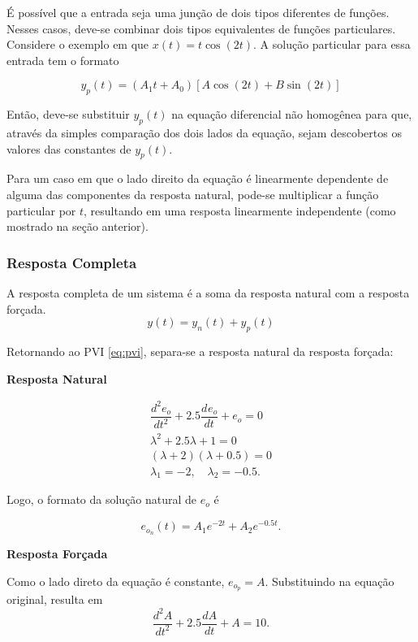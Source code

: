 \documentclass{article}
\numberwithin{equation}{section}
\newcommand{\deo}[1]{\dfrac{d^{#1}e_o}{dt^{#1}}}
\begin{document}
É possível que a entrada seja uma junção de dois tipos diferentes de funções. Nesses casos, deve-se combinar dois tipos equivalentes de funções particulares. Considere o exemplo em que $x(t) = t \cos(2t)$. A solução particular para essa entrada tem o formato

\begin{equation*}
    y_{p}(t)=(A_{1}t+A_{0})[A\cos(2t)+B\sin(2t)]
\end{equation*}

Então, deve-se substituir $y_{p}(t)$ na equação diferencial não homogênea para que, através da simples comparação dos dois lados da equação, sejam descobertos os valores das constantes de $y_{p}(t)$.

Para um caso em que o lado direito da equação é linearmente dependente de alguma das componentes da resposta natural, pode-se multiplicar a função particular por $t$, resultando em uma resposta linearmente independente (como mostrado na seção anterior).

\subsubsection{Resposta Completa}
\label{subsubsec:completa}

A resposta completa de um sistema é a soma da resposta natural com a resposta forçada. $$y(t)=y_n(t)+y_p(t)$$

Retornando ao PVI \eqref{eq:pvi}, separa-se a resposta natural da resposta forçada:
\vspace{2mm}
\begin{center}{\textbf{Resposta Natural}}\end{center}
\begin{gather*}
    \deo{2} + 2.5\deo{} + e_o = 0
    \\
    \lambda^{2} + 2.5\lambda + 1 = 0
    \\
    (\lambda+2)(\lambda+0.5) = 0
    \\
    \lambda_{1}=-2, \quad \lambda_{2}=-0.5.
\end{gather*}

\noindent Logo, o formato da solução natural de $e_o$ é

\begin{equation}
    e_{o_n}(t) = A_1e^{-2t}+A_2e^{-0.5t}.
\end{equation}
\vspace{0.1cm}
\begin{center}{\textbf{Resposta Forçada}}\end{center}
Como o lado direto da equação é constante, $e_{o_p} = A$. Substituindo na equação original, resulta em
\begin{equation*}
    \frac{d^2A}{dt^2} + 2.5 \frac{dA}{dt} + A = 10.
\end{equation*}
\end{document}
